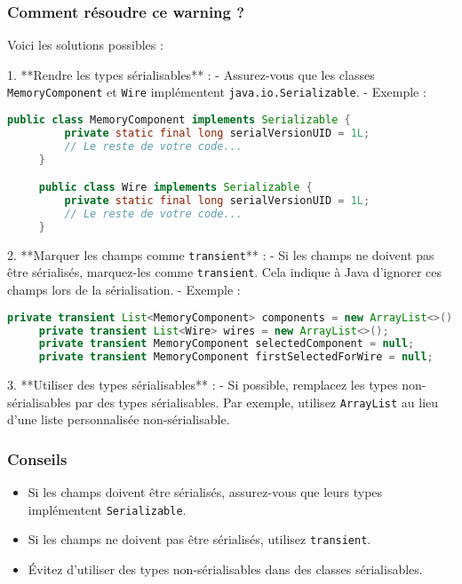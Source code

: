 \documentclass[a4paper,12pt]{article}
\begin{document}
\subsubsection*{Comment résoudre ce warning ?}
Voici les solutions possibles :

1. **Rendre les types sérialisables** :
   - Assurez-vous que les classes \texttt{MemoryComponent} et \texttt{Wire} implémentent \texttt{java.io.Serializable}.
   - Exemple :
     \begin{lstlisting}[language=java]
     public class MemoryComponent implements Serializable {
         private static final long serialVersionUID = 1L;
         // Le reste de votre code...
     }

     public class Wire implements Serializable {
         private static final long serialVersionUID = 1L;
         // Le reste de votre code...
     }
     \end{lstlisting}

2. **Marquer les champs comme \texttt{transient}** :
   - Si les champs ne doivent pas être sérialisés, marquez-les comme \texttt{transient}. Cela indique à Java d'ignorer ces champs lors de la sérialisation.
   - Exemple :
     \begin{lstlisting}[language=java]
     private transient List<MemoryComponent> components = new ArrayList<>();
     private transient List<Wire> wires = new ArrayList<>();
     private transient MemoryComponent selectedComponent = null;
     private transient MemoryComponent firstSelectedForWire = null;
     \end{lstlisting}

3. **Utiliser des types sérialisables** :
   - Si possible, remplacez les types non-sérialisables par des types sérialisables. Par exemple, utilisez \texttt{ArrayList} au lieu d'une liste personnalisée non-sérialisable.

\subsubsection*{Conseils}
\begin{itemize}
    \item Si les champs doivent être sérialisés, assurez-vous que leurs types implémentent \texttt{Serializable}.
    \item Si les champs ne doivent pas être sérialisés, utilisez \texttt{transient}.
    \item Évitez d'utiliser des types non-sérialisables dans des classes sérialisables.
\end{itemize}
\end{document}
